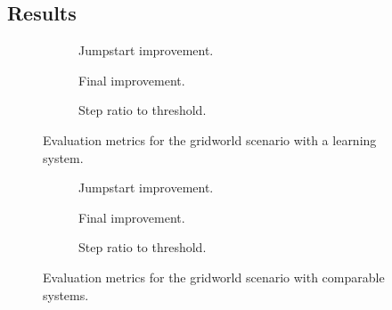 \subsection{Results}
\begin{figure}
    \centering
    \begin{subfigure}[b]{0.32\textwidth}
        \centering
        
        \caption{Jumpstart improvement.}
        \label{fig:gwl_jumpstart}
    \end{subfigure}
    \hfill
    \begin{subfigure}[b]{0.32\textwidth}
        \centering
        
        \caption{Final improvement.}
        \label{fig:gwl_final}
    \end{subfigure}
    \hfill
    \begin{subfigure}[b]{0.32\textwidth}
        \centering
        
        \caption{Step ratio to threshold.}
        \label{fig:gwl_step}
    \end{subfigure}
    \caption{Evaluation metrics for the gridworld scenario with a learning system.}
    \label{fig:gwl}
\end{figure}



\begin{figure}
    \centering
    \begin{subfigure}[b]{0.32\textwidth}
        \centering
        
        \caption{\small Jumpstart improvement.}
        \label{fig:gwc_jumpstart}
    \end{subfigure}
    \hfill
    \begin{subfigure}[b]{0.32\textwidth}
        \centering
        
        \caption{\small Final improvement.}
        \label{fig:gwc_final}
    \end{subfigure}
    \hfill
    \begin{subfigure}[b]{0.32\textwidth}
        \centering
        
        \caption{\small Step ratio to threshold.}
        \label{fig:gwc_step}
    \end{subfigure}
    \caption{Evaluation metrics for the gridworld scenario with comparable systems.}
    \label{fig:gwc}
\end{figure}




